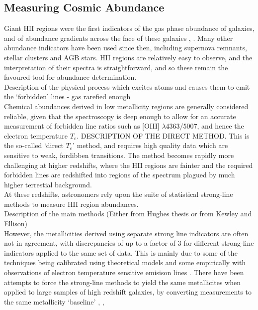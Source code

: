 \documentclass{literature}
\begin{document}
\subsection{Measuring Cosmic Abundance}\label{subsec:abundance}
Giant HII regions were the first indicators of the gas phase abundance of galaxies, and of abundance gradients across the face of these galaxies \citep{Searle1971}, \citep{Shields1974}. Many other abundance indicators have been used since then, including supernova remnants, stellar clusters and AGB stars. HII regions are relatively easy to observe, and the interpretation of their spectra is straightforward, and so these remain the favoured tool for abundance determination.  \\


Description of the physical process which excites atoms and causes them to emit the `forbidden' lines - gas rarefied enough \\


Chemical abundances derived in low metallicity regions are generally considered reliable, given that the spectroscopy is deep enough to allow for an accurate measurement of forbidden line ratios such as [OIII] $\lambda 4363/5007$, and hence the electron temperature $T_{e}$. DESCRIPTION OF THE DIRECT METHOD. This is the so-called `direct $T_{e}$' method, and requires high quality data which are sensitive to weak, fordibben transitions. The method becomes rapidly more challenging at higher redshifts, where the HII regions are fainter and the required forbidden lines are redshifted into regions of the spectrum plagued by much higher terrestial background. \\   






At these redshifts, astronomers rely upon the suite of statistical strong-line methods to measure HII region abundances. \\

Description of the main methods (Either from Hughes thesis or from Kewley and Ellison) \\ 

However, the metallicities derived using separate strong line indicators are often not in agreement, with discrepancies of up to a factor of 3 for different strong-line indicators applied to the same set of data. This is mainly due to some of the techniques being calibrated using theoretical models and some empirically with observations of electron temperature sensitive emisison lines \citep{Stasinska2005}. There have been attempts to force the strong-line methods to yield the same metallicites when applied to large samples of high redshift galaxies, by converting measurements to the same metallicity `baseline' \citep{Kewley_2008}, \citep{Kewley2002}, \citep{Maiolino2008}
\end{document}
